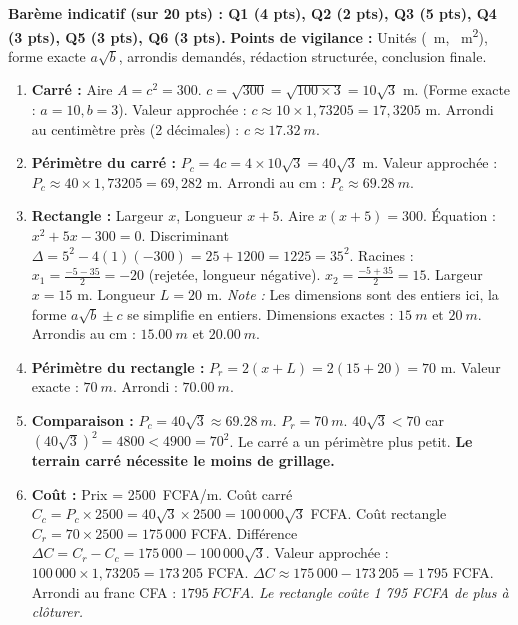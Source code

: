 \documentclass[11pt]{article}
\begin{document}
\begin{corrige}
\textbf{Barème indicatif (sur 20 pts) : Q1 (4 pts), Q2 (2 pts), Q3 (5 pts), Q4 (3 pts), Q5 (3 pts), Q6 (3 pts).}
\textbf{Points de vigilance :} Unités (\SI{}{m}, \SI{}{m^2}), forme exacte $a\sqrt{b}$, arrondis demandés, rédaction structurée, conclusion finale.

\begin{enumerate}
    \item \textbf{Carré :} Aire $A = c^2 = 300$.
    $c = \sqrt{300} = \sqrt{100 \times 3} = 10\sqrt{3}$ m. (Forme exacte : $a=10, b=3$).
    Valeur approchée : $c \approx 10 \times 1,73205 = 17,3205$ m.
    Arrondi au centimètre près (2 décimales) : $\boxed{c \approx \SI{17,32}{m}}$.
    
    \item \textbf{Périmètre du carré :} $P_c = 4c = 4 \times 10\sqrt{3} = 40\sqrt{3}$ m.
    Valeur approchée : $P_c \approx 40 \times 1,73205 = 69,282$ m.
    Arrondi au cm : $\boxed{P_c \approx \SI{69,28}{m}}$.
    
    \item \textbf{Rectangle :} Largeur $x$, Longueur $x+5$. Aire $x(x+5) = 300$.
    Équation : $x^2 + 5x - 300 = 0$.
    Discriminant $\Delta = 5^2 - 4(1)(-300) = 25 + 1200 = 1225 = 35^2$.
    Racines : $x_1 = \frac{-5 - 35}{2} = -20$ (rejetée, longueur négative).
    $x_2 = \frac{-5 + 35}{2} = 15$.
    Largeur $x = 15$ m. Longueur $L = 20$ m.
    \textit{Note :} Les dimensions sont des entiers ici, la forme $a\sqrt{b} \pm c$ se simplifie en entiers. Dimensions exactes : $\boxed{\SI{15}{m} \text{ et } \SI{20}{m}}$. Arrondis au cm : $\SI{15,00}{m}$ et $\SI{20,00}{m}$.
    
    \item \textbf{Périmètre du rectangle :} $P_r = 2(x + L) = 2(15 + 20) = 70$ m.
    Valeur exacte : $\boxed{\SI{70}{m}}$. Arrondi : $\SI{70,00}{m}$.
    
    \item \textbf{Comparaison :} $P_c = 40\sqrt{3} \approx \SI{69,28}{m}$. $P_r = \SI{70}{m}$.
    $40\sqrt{3} < 70$ car $(40\sqrt{3})^2 = 4800 < 4900 = 70^2$.
    Le carré a un périmètre plus petit. \textbf{Le terrain carré nécessite le moins de grillage.}
    
    \item \textbf{Coût :} Prix = \SI{2500}{FCFA/m}.
    Coût carré $C_c = P_c \times 2500 = 40\sqrt{3} \times 2500 = 100\,000\sqrt{3}$ FCFA.
    Coût rectangle $C_r = 70 \times 2500 = 175\,000$ FCFA.
    Différence $\Delta C = C_r - C_c = 175\,000 - 100\,000\sqrt{3}$.
    Valeur approchée : $100\,000 \times 1,73205 = 173\,205$ FCFA.
    $\Delta C \approx 175\,000 - 173\,205 = 1\,795$ FCFA.
    Arrondi au franc CFA : $\boxed{\SI{1795}{FCFA}}$.
    \textit{Le rectangle coûte 1 795 FCFA de plus à clôturer.}
\end{enumerate}
\end{corrige}
\end{document}
